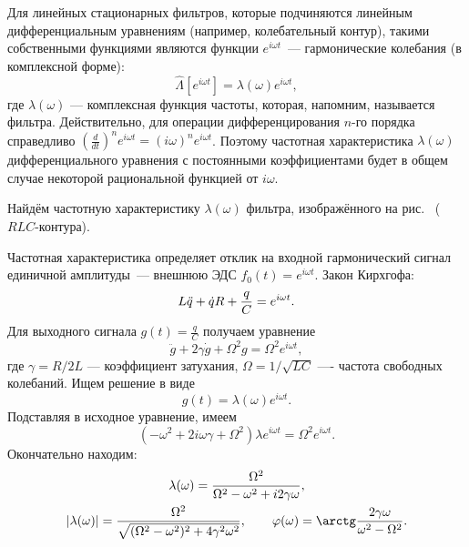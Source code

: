 Для линейных стационарных фильтров, которые подчиняются линейным
дифференциальным уравнениям (например, колебательный контур),
такими собственными функциями являются функции $e^{i\omega t}$~--- гармонические
колебания (в комплексной форме):
\begin{equation*}
\hat\Lambda\left[e^{i\omega t}\right]=\lambda(\omega)e^{i\omega t},
\end{equation*}
где $\lambda(\omega)$ --- комплексная функция частоты, которая, напомним,
называется  фильтра.
Действительно, для операции дифференцирования $n$-го порядка справедливо
$\left(\frac{d}{dt}\right)^n e^{i\omega t} = (i\omega)^n e^{i\omega t}$.
Поэтому частотная характеристика $\lambda(\omega)$ дифференциального уравнения
с постоянными коэффициентами будет в общем случае некоторой рациональной
функцией от $i\omega$.

\begin{lab:example}\label{example:RLC}
Найдём частотную характеристику $\lambda(\omega)$ фильтра,
изображённого на рис.~ ($RLC$-контура).

Частотная характеристика определяет отклик на входной гармонический сигнал
единичной амплитуды~--- внешнюю ЭДС $f_0(t)=e^{i\omega t}$.
Закон Кирхгофа:
\begin{equation}
    \eqmark{RLC}
L\ddot{q} + \dot{q}R+\frac{q}{C}=e^{i\omega t}.
\end{equation}
Для выходного сигнала $g(t)=\frac{q}{C}$ получаем уравнение
\begin{equation*}
\ddot{g}+2\gamma\dot{g}+\Omega^2g=\Omega^2 e^{i\omega t},
\end{equation*}
где $\gamma = R/2L$ --- коэффициент затухания,
$\Omega = 1/\sqrt{LC}$ ---- частота свободных колебаний.
Ищем решение в виде
\begin{equation*}
g(t)=\lambda(\omega)e^{i\omega t}.
\end{equation*}
Подставляя в исходное уравнение, имеем
\begin{equation*}
    (-\omega^2 +2i\omega\gamma + \Omega^2) \lambda e^{i\omega t}=\Omega^2 e^{i\omega t}.
\end{equation*}
Окончательно находим:
\begin{equation}
    \eqmark{RLC-lambda}
\begin{gathered}
\lambda(\omega)=\frac{\Omega^2}{\Omega^2-\omega^2+i2\gamma\omega},\\
\left|\lambda(\omega)\right|=\frac{\Omega^2}{\sqrt{
(\Omega^2-\omega^2)^2+4\gamma^2\omega^2}},
\qquad \varphi(\omega)=\arctg\frac{2\gamma\omega}{\omega^2-\Omega^2}.
\end{gathered}
\end{equation}
\end{lab:example}

